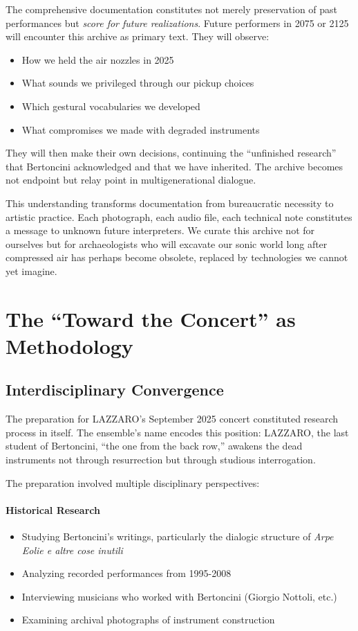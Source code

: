 The comprehensive documentation constitutes not merely preservation of past 
performances but \emph{score for future realizations}. Future performers in 
2075 or 2125 will encounter this archive as primary text. They will observe:
\begin{itemize}
  \item How we held the air nozzles in 2025
  \item What sounds we privileged through our pickup choices
  \item Which gestural vocabularies we developed
  \item What compromises we made with degraded instruments
\end{itemize}

They will then make their own decisions, continuing the ``unfinished research'' 
that Bertoncini acknowledged and that we have inherited. The archive becomes 
not endpoint but relay point in multigenerational dialogue.

This understanding transforms documentation from bureaucratic necessity to 
artistic practice. Each photograph, each audio file, each technical note 
constitutes a message to unknown future interpreters. We curate this archive 
not for ourselves but for archaeologists who will excavate our sonic world 
long after compressed air has perhaps become obsolete, replaced by technologies 
we cannot yet imagine.

\section{The ``Toward the Concert'' as Methodology}

\subsection{Interdisciplinary Convergence}

The preparation for LAZZARO's September 2025 concert constituted research 
process in itself. The ensemble's name encodes this position: LAZZARO, the 
last student of Bertoncini, ``the one from the back row,'' awakens the dead 
instruments not through resurrection but through studious interrogation.

The preparation involved multiple disciplinary perspectives:

\paragraph{Historical Research}
\begin{itemize}
  \item Studying Bertoncini's writings, particularly the dialogic structure 
  of \emph{Arpe Eolie e altre cose inutili}
  \item Analyzing recorded performances from 1995-2008
  \item Interviewing musicians who worked with Bertoncini (Giorgio Nottoli, 
  etc.)
  \item Examining archival photographs of instrument construction
\end{itemize}

